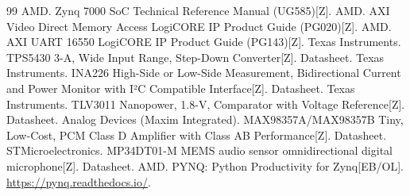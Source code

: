 \begin{thebibliography}{99}
 AMD. Zynq 7000 SoC Technical Reference Manual (UG585)[Z].
 AMD. AXI Video Direct Memory Access LogiCORE IP Product Guide (PG020)[Z].
 AMD. AXI UART 16550 LogiCORE IP Product Guide (PG143)[Z].
 Texas Instruments. TPS5430 3-A, Wide Input Range, Step-Down Converter[Z]. Datasheet.
 Texas Instruments. INA226 High-Side or Low-Side Measurement, Bidirectional Current and Power Monitor with I²C Compatible Interface[Z]. Datasheet.
 Texas Instruments. TLV3011 Nanopower, 1.8-V, Comparator with Voltage Reference[Z]. Datasheet.
 Analog Devices (Maxim Integrated). MAX98357A/MAX98357B Tiny, Low-Cost, PCM Class D Amplifier with Class AB Performance[Z]. Datasheet.
 STMicroelectronics. MP34DT01-M MEMS audio sensor omnidirectional digital microphone[Z]. Datasheet.
 AMD. PYNQ: Python Productivity for Zynq[EB/OL]. \url{https://pynq.readthedocs.io/}.
\end{thebibliography}
\endgroup
